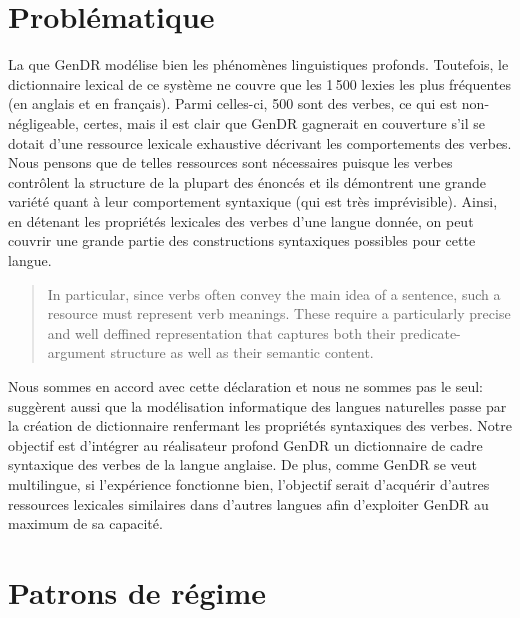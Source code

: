 
\section{Problématique}\label{sec:problema}

La  que GenDR modélise bien les phénomènes linguistiques profonds. Toutefois, le dictionnaire lexical de ce système ne couvre que les 1\,500 lexies les plus fréquentes (en anglais et en français). Parmi celles-ci, 500 sont des verbes, ce qui est non-négligeable, certes, mais il est clair que GenDR gagnerait en couverture s'il se dotait d'une ressource lexicale exhaustive décrivant les comportements des verbes. Nous pensons que de telles ressources sont nécessaires puisque les verbes contrôlent la structure de la plupart des énoncés et ils démontrent une grande variété quant à leur comportement syntaxique (qui est très imprévisible). Ainsi, en détenant les propriétés lexicales des verbes d'une langue donnée, on peut couvrir une grande partie des constructions syntaxiques possibles pour cette langue.

\begin{quote}
In particular, since verbs often convey the main idea of a sentence, such a resource must represent verb meanings. These require a particularly precise and well deffined representation that captures both their predicate-argument structure as well as their semantic content.
\end{quote}
\vspace{-\baselineskip}
\hfill
\cite{SchulerVerbnetBroadcoverageComprehensive2005}

Nous sommes en accord avec cette déclaration et nous ne sommes pas le seul:  \cite{Korhonenlargesubcategorizationlexicon2006} suggèrent aussi que la modélisation informatique des langues naturelles passe par la création de dictionnaire renfermant les propriétés syntaxiques des verbes. Notre objectif est d'intégrer au réalisateur profond GenDR un dictionnaire de cadre syntaxique des verbes de la langue anglaise. De plus, comme GenDR se veut multilingue, si l'expérience fonctionne bien, l'objectif serait d'acquérir d'autres ressources lexicales similaires dans d'autres langues afin d'exploiter GenDR au maximum de sa capacité.

\section{Patrons de régime}\label{sec:gp}

